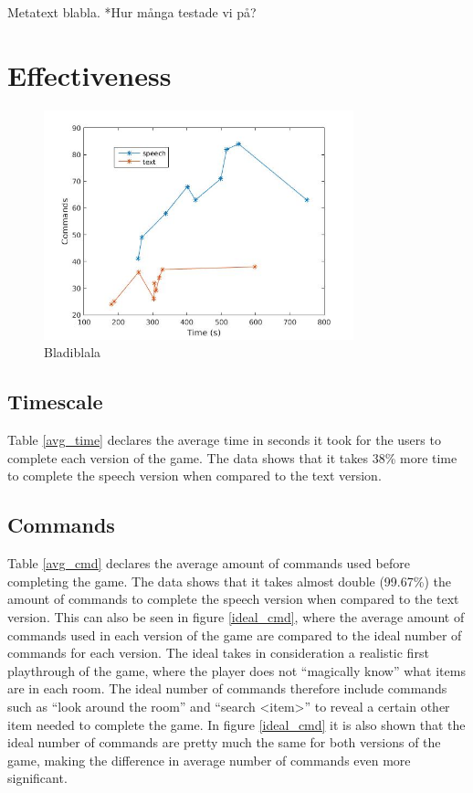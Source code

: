 Metatext blabla.
*Hur många testade vi på?

\section{Effectiveness}

\begin{figure}[p]
  \centering
  \includegraphics[width=0.8\textwidth]{images/time_cmd.jpg} %
  \caption{Bladiblala}\label{time_cmd}
\end{figure}

\subsection{Timescale} %
Table \ref{avg_time} declares the average time in seconds it took for the users to complete each version of the game. The data shows that it takes 38\% more time to complete the speech version when compared to the text version.

\subsection{Commands} %
Table \ref{avg_cmd} declares the average amount of commands used before completing the game. The data shows that it takes almost double (99.67\%) the amount of commands to complete the speech version when compared to the text version. This can also be seen in figure \ref{ideal_cmd}, where the average amount of commands used in each version of the game are compared to the ideal number of commands for each version. The ideal takes in consideration a realistic first playthrough of the game, where the player does not ``magically know'' what items are in each room. The ideal number of commands therefore include commands such as ``look around the room'' and ``search <item>'' to reveal a certain other item needed to complete the game. In figure \ref{ideal_cmd} it is also shown that the ideal number of commands are pretty much the same for both versions of the game, making the difference in average number of commands even more significant.

